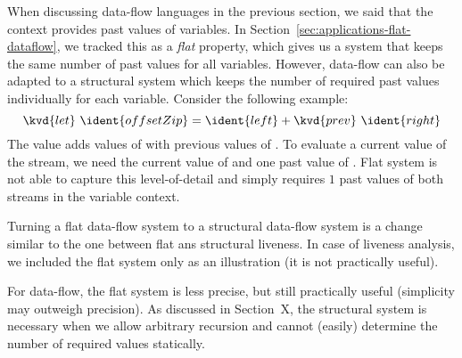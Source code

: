 When discussing data-flow languages in the previous section, we said that the context provides 
past values of variables. In Section~\ref{sec:applications-flat-dataflow}, we tracked this as 
a \emph{flat} property, which gives us a system that keeps the same number of past values for
all variables. However, data-flow can also be adapted to a structural system which keeps the number 
of required past values individually for each variable. Consider the 
following example:
%
\begin{equation*}
\kvd{let}~\ident{offsetZip} = \ident{left} + \kvd{prev}~\ident{right}
\end{equation*}
%
The value  adds values of  with previous values of .
To evaluate a current value of the stream, we need the current value of  and one past
value of . Flat system is not able to capture this level-of-detail and simply
requires $1$ past values of both streams in the variable context.

Turning a flat data-flow system to a structural data-flow system is a change similar to the one
between flat ans structural liveness. In case of liveness analysis, we included the flat system
only as an illustration (it is not practically useful). 

For data-flow, the flat system is less precise, but still practically useful (simplicity may outweigh 
precision). As discussed in Section~X, the structural system is necessary when we allow arbitrary 
recursion and cannot (easily) determine the number of required values statically.


